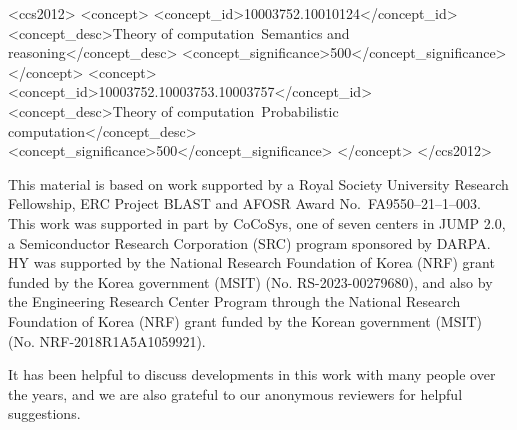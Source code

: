 \documentclass[acmsmall,screen,nonacm]{acmart}
\begin{document}
\begin{CCSXML}
<ccs2012>
   <concept>
       <concept_id>10003752.10010124</concept_id>
       <concept_desc>Theory of computation~Semantics and reasoning</concept_desc>
       <concept_significance>500</concept_significance>
       </concept>
   <concept>
       <concept_id>10003752.10003753.10003757</concept_id>
       <concept_desc>Theory of computation~Probabilistic computation</concept_desc>
       <concept_significance>500</concept_significance>
       </concept>
 </ccs2012>
\end{CCSXML}



\maketitle












\begin{acks}
  This material is based on work supported by a Royal Society University Research Fellowship, ERC Project BLAST and AFOSR Award No.~FA9550–21–1–003. This work was supported in part by CoCoSys, one of seven centers in JUMP 2.0, a Semiconductor Research Corporation (SRC) program sponsored by DARPA. HY was supported by the National Research Foundation of Korea (NRF) grant funded by the Korea government (MSIT) (No. RS-2023-00279680), and also by the Engineering Research Center Program through the National Research Foundation of Korea (NRF) grant funded by the Korean government (MSIT) (No. NRF-2018R1A5A1059921).

It has been helpful to discuss developments in this work with many people over the years, and we are also grateful to our anonymous reviewers for helpful suggestions. 
\end{acks}


%
\enlargethispage{\baselineskip}

\end{document}
